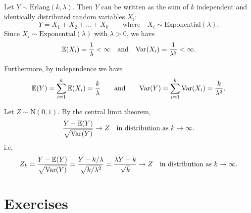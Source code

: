 \begin{solution}
Let $Y\sim\text{Erlang}(k,\lambda)$. Then $Y$ can be written as the sum of $k$ independent and identically distributed random variables $X_i$:
\[
Y = X_1 + X_2 + \ldots + X_k\qquad\text{where}\quad X_i\sim\text{Exponential}(\lambda).
\]
Since $X_i\sim\text{Exponential}(\lambda)$ with $\lambda > 0$, we have 
\[
\mathbb{E}(X_i) = \frac{1}{\lambda} <\infty
\text{\quad and\quad}
\text{Var}(X_i) = \frac{1}{\lambda^2} <\infty.
\]

Furthermore, by independence we have
\[
\mathbb{E}(Y)= \sum_{i=1}^k \mathbb{E}(X_i) = \frac{k}{\lambda}
\qquad\text{and}\qquad
\text{Var}(Y) =  \sum_{i=1}^k \text{Var}(X_i) = \frac{k}{\lambda^2}.
\]

Let $Z\sim\text{N}(0,1)$. By the central limit theorem,
\[
\frac{Y - \mathbb{E}(Y)}{\sqrt{\text{Var}(Y)}} \to Z \quad\text{in distribution as $k\to\infty$.}
\]
i.e.\
\[
Z_k = \frac{Y - \mathbb{E}(Y)}{\sqrt{\text{Var}(Y)}} 
	= \frac{Y - k/\lambda}{\sqrt{k/\lambda^2}} 
	= \frac{\lambda Y - k}{\sqrt{k}} 
	\to Z \quad\text{in distribution as $k\to\infty$.}
\]
\end{solution}


\section{Exercises}


\endinput

